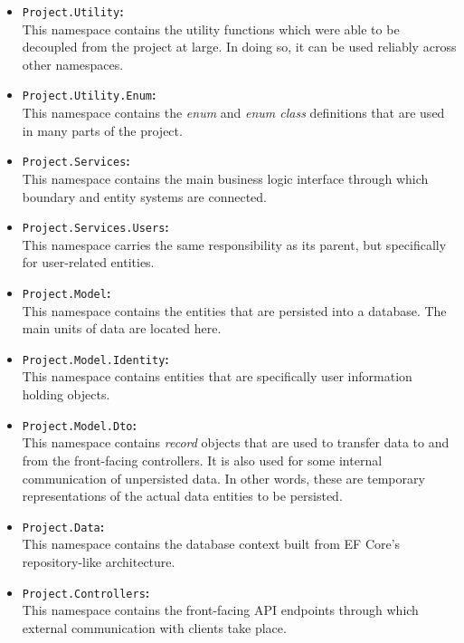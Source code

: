 \documentclass[a4paper, 12pt, titlepage]{article}
\begin{document}
  \begin{itemize}
    \item \texttt{Project.Utility}\textbf{:}\\
      This namespace contains the utility functions which were able to be decoupled from the project at large.
      In doing so, it can be used reliably across other namespaces.
    \item \texttt{Project.Utility.Enum}\textbf{:}\\
      This namespace contains the \textit{enum} and \textit{enum class} definitions that are used in many parts of the project.
    \item \texttt{Project.Services}\textbf{:}\\
      This namespace contains the main business logic interface through which boundary and entity systems are connected.
    \item \texttt{Project.Services.Users}\textbf{:}\\
      This namespace carries the same responsibility as its parent, but specifically for user-related entities.
    \item \texttt{Project.Model}\textbf{:}\\
      This namespace contains the entities that are persisted into a database. The main units of data are located here.
    \item \texttt{Project.Model.Identity}\textbf{:}\\
      This namespace contains entities that are specifically user information holding objects.
    \item \texttt{Project.Model.Dto}\textbf{:}\\
      This namespace contains \textit{record} objects that are used to transfer data to and from the front-facing controllers.
      It is also used for some internal communication of unpersisted data.
      In other words, these are temporary representations of the actual data entities to be persisted.
    \item \texttt{Project.Data}\textbf{:}\\
      This namespace contains the database context built from EF Core's repository-like architecture.
    \item \texttt{Project.Controllers}\textbf{:}\\
      This namespace contains the front-facing API endpoints through which external communication with clients take place.
  \end{itemize}
\end{document}
